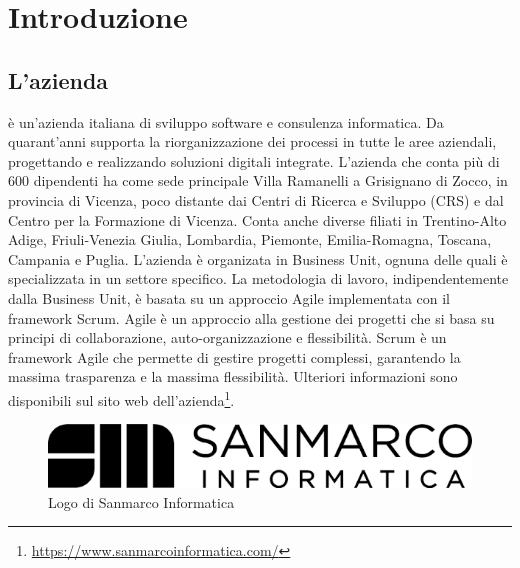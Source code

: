 \chapter{Introduzione}
\label{cap:introduzione}

%
%
%
%
%
%
%


\section{L'azienda}

\myCompany è un'azienda italiana di sviluppo software e consulenza informatica. Da quarant'anni supporta la riorganizzazione dei processi in tutte le aree aziendali, progettando e realizzando soluzioni digitali integrate. 
\newline
L'azienda che conta più di 600 dipendenti ha come sede principale Villa Ramanelli a Grisignano di Zocco, in provincia di Vicenza, poco distante dai Centri di Ricerca e Sviluppo (CRS) e dal Centro per la Formazione di Vicenza. Conta anche diverse filiati in Trentino-Alto Adige, Friuli-Venezia Giulia, Lombardia, Piemonte, Emilia-Romagna, Toscana, Campania e Puglia. 
\newline
L'azienda è organizata in Business Unit, ognuna delle quali è specializzata in un settore specifico. 
\newline
La metodologia di lavoro, indipendentemente dalla Business Unit, è basata su un approccio Agile implementata con il framework Scrum. Agile è un approccio alla gestione dei progetti che si basa su principi di collaborazione, auto-organizzazione e flessibilità. Scrum è un framework Agile che permette di gestire progetti complessi, garantendo la massima trasparenza e la massima flessibilità.
\newline
Ulteriori informazioni sono disponibili sul sito web dell'azienda\footnote{\url{https://www.sanmarcoinformatica.com/}}.
\begin{figure}[h!]
    \centering
    \includegraphics[width=0.5\columnwidth]{img/logo_sanmarco_informatica.png}
    \caption{Logo di Sanmarco Informatica}
    \label{fig:entanglement}
\end{figure}
